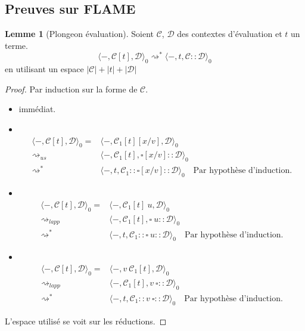 \documentclass[11pt,a4paper]{article}
\theoremstyle{definition}
\newtheorem{lemma}[theorem]{Lemme}
\newcommand{\mtd}{\mathcal{D}}
\newcommand{\mtc}{\mathcal{C}}
\begin{document}
\subsection{Preuves sur FLAME}
\begin{lemma}[Plongeon évaluation]
  \label{lemmaplouf}
  Soient $\mathcal{C}$, $\mathcal{D}$ des contextes d'évaluation et $t$ un terme.
\[\langle -,\mathcal{C}[t], \mathcal{D}\rangle_0 \rightsquigarrow^* \langle -,t,\mathcal{C} :: \mathcal{D}\rangle_0\]
en utilisant un espace $|\mtc|+|t|+|\mtd|$
\end{lemma}
\begin{proof}
  Par induction sur la forme de $\mathcal{C}$.
  \begin{itemize}
    \item {} immédiat.\\
    \item {}\\
  \begin{align*}
    \langle -, \mathcal{C}[t], \mathcal{D}\rangle_0 = &\langle -, \mathcal{C}_1[t][x/v], \mathcal{D}\rangle_0 \\
    \rightsquigarrow_{us} &\langle -, \mathcal{C}_1[t], \square[x/v]:: \mathcal{D}\rangle_0 \\
    \rightsquigarrow^* &\langle -, t, \mathcal{C}_1:: \square[x/v]:: \mathcal{D}\rangle_0 \quad \text{Par hypothèse d'induction.}
  \end{align*}
    \item {}\\
  \begin{align*}
    \langle -, \mathcal{C}[t], \mathcal{D}\rangle_0 = &\langle -, \mathcal{C}_1[t]~u, \mathcal{D}\rangle_0 \\
    \rightsquigarrow_{lapp} &\langle -, \mathcal{C}_1[t], \square~u:: \mathcal{D}\rangle_0 \\
    \rightsquigarrow^* &\langle -, t, \mathcal{C}_1:: \square~u:: \mathcal{D}\rangle_0 \quad \text{Par hypothèse d'induction.}
  \end{align*}
    \item {}\\
  \begin{align*}
    \langle -, \mathcal{C}[t], \mathcal{D}\rangle_0 = &\langle -, v~\mathcal{C}_1[t], \mathcal{D}\rangle_0 \\
    \rightsquigarrow_{lapp} &\langle -, \mathcal{C}_1[t], v~\square:: \mathcal{D}\rangle_0 \\
    \rightsquigarrow^* &\langle -, t, \mathcal{C}_1:: v~\square:: \mathcal{D}\rangle_0 \quad \text{Par hypothèse d'induction.}
  \end{align*}
  \end{itemize}
  L'espace utilisé se voit sur les réductions.
\end{proof}
\end{document}
